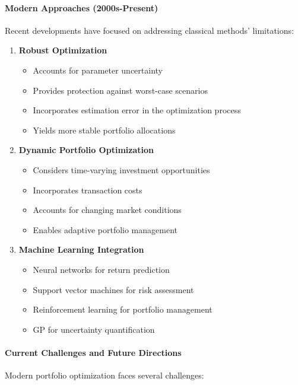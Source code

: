 \paragraph{Modern Approaches (2000s-Present)}
Recent developments have focused on addressing classical methods' limitations:

\begin{enumerate}
    \item \textbf{Robust Optimization}
    \begin{itemize}
        \item Accounts for parameter uncertainty
        \item Provides protection against worst-case scenarios
        \item Incorporates estimation error in the optimization process
        \item Yields more stable portfolio allocations
    \end{itemize}

    \item \textbf{Dynamic Portfolio Optimization}
    \begin{itemize}
        \item Considers time-varying investment opportunities
        \item Incorporates transaction costs
        \item Accounts for changing market conditions
        \item Enables adaptive portfolio management
    \end{itemize}

    \item \textbf{Machine Learning Integration}
    \begin{itemize}
        \item Neural networks for return prediction \parencite{heaton2017deep}
        \item Support vector machines for risk assessment
        \item Reinforcement learning for portfolio management
        \item \ac{GP} for uncertainty quantification
    \end{itemize}
\end{enumerate}

\paragraph{Current Challenges and Future Directions}
Modern portfolio optimization faces several challenges:

